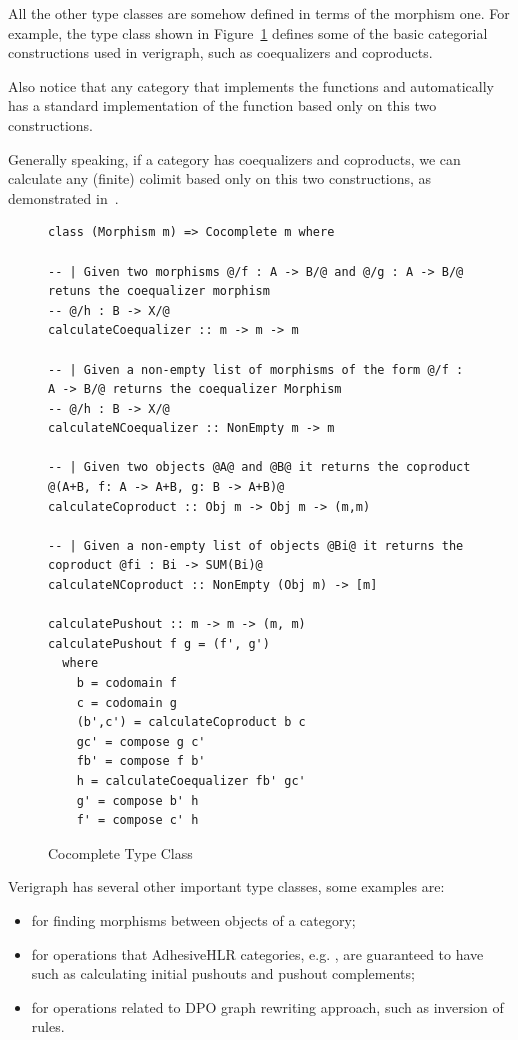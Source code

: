 All the other type classes are somehow defined in terms of the morphism one. For example, the  type class shown in Figure~\ref{fig:verigraph:cocomplete-type-class} defines some of the basic categorial constructions used in verigraph, such as coequalizers and coproducts. 

Also notice that any category that implements the functions  and  automatically has a standard implementation of the  function based only on this two constructions.

Generally speaking, if a category has coequalizers and coproducts, we can calculate any (finite) colimit based only on this two constructions, as demonstrated in~\cite{Pierce1991}. 

\begin{figure}[!ht]
  \begin{verbatim}
class (Morphism m) => Cocomplete m where

-- | Given two morphisms @/f : A -> B/@ and @/g : A -> B/@ retuns the coequalizer morphism
-- @/h : B -> X/@
calculateCoequalizer :: m -> m -> m

-- | Given a non-empty list of morphisms of the form @/f : A -> B/@ returns the coequalizer Morphism
-- @/h : B -> X/@
calculateNCoequalizer :: NonEmpty m -> m

-- | Given two objects @A@ and @B@ it returns the coproduct @(A+B, f: A -> A+B, g: B -> A+B)@
calculateCoproduct :: Obj m -> Obj m -> (m,m)

-- | Given a non-empty list of objects @Bi@ it returns the coproduct @fi : Bi -> SUM(Bi)@
calculateNCoproduct :: NonEmpty (Obj m) -> [m]

calculatePushout :: m -> m -> (m, m)
calculatePushout f g = (f', g')
  where
    b = codomain f
    c = codomain g
    (b',c') = calculateCoproduct b c
    gc' = compose g c'
    fb' = compose f b'
    h = calculateCoequalizer fb' gc'
    g' = compose b' h
    f' = compose c' h
\end{verbatim}
\caption{Cocomplete Type Class}\label{fig:verigraph:cocomplete-type-class}
\end{figure}

Verigraph has several other important type classes, some examples are:
\begin{itemize}
  \item {} for finding morphisms between objects of a category;
  \item {} for operations that AdhesiveHLR categories, e.g. , are guaranteed to have such as calculating initial pushouts and pushout complements;
  \item {} for operations related to DPO graph rewriting approach, such as inversion of rules.
\end{itemize}

